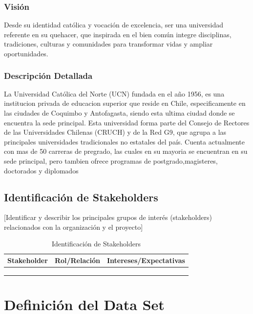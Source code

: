 \documentclass[12pt,letterpaper]{report}
\begin{document}
\subsection{Visión}
Desde su identidad católica y vocación de excelencia, ser una universidad referente en su quehacer, que inspirada en el bien común integre disciplinas, tradiciones, culturas y comunidades para transformar vidas y ampliar oportunidades. 

\subsection{Descripción Detallada}
La Universidad Católica del Norte (UCN) fundada en el año 1956, es una institucion privada de educacion superior que reside en Chile, especificamente en las ciudades de Coquimbo y Antofagasta, siendo esta ultima ciudad donde se encuentra la sede principal. Esta universidad forma parte del Consejo de Rectores de las Universidades Chilenas (CRUCH) y de la Red G9, que agrupa a las principales universidades tradicionales no estatales del país. Cuenta  actualmente con mas de 50 carreras de pregrado, las cuales en su mayoria se encuentran en su sede principal, pero tambien ofrece programas de postgrado,magisteres, doctorados y diplomados

\section{Identificación de Stakeholders}
[Identificar y describir los principales grupos de interés (stakeholders) relacionados con la organización y el proyecto]

\begin{table}[H]
    \centering
    \begin{tabularx}{\textwidth}{|X|X|X|}
        \hline
        \textbf{Stakeholder} & \textbf{Rol/Relación} & \textbf{Intereses/Expectativas} \\
        \hline
        & & \\
        \hline
        & & \\
        \hline
        & & \\
        \hline
    \end{tabularx}
    \caption{Identificación de Stakeholders}
\end{table}

\newpage

\chapter{Definición del Data Set}
\end{document}

